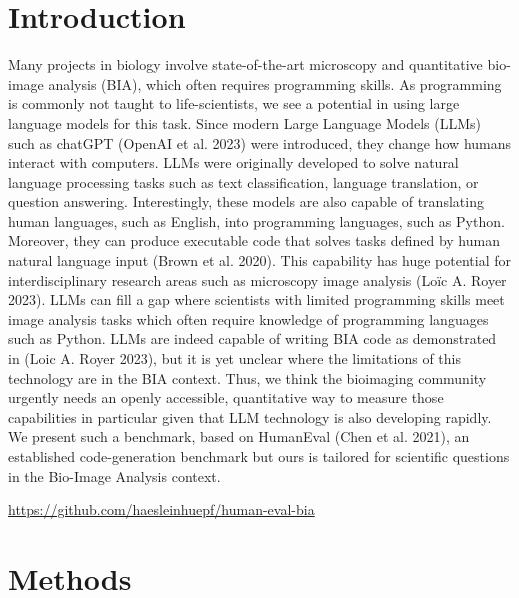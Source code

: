 \documentclass[doubleblind]{ecai}
\begin{document}

\section{Introduction}

Many projects in biology involve state-of-the-art microscopy and  quantitative bio-image analysis (BIA), which often requires programming skills. As programming is commonly not taught to life-scientists, we see a potential in using large language models for this task. Since modern Large Language Models (LLMs) such as chatGPT (OpenAI et al. 2023) were introduced, they change how humans interact with computers. LLMs were originally developed to solve  natural language processing tasks such as  text classification, language translation, or question answering. Interestingly, these models  are also capable of translating human languages, such as English, into programming languages, such as Python. Moreover, they can produce executable code that solves tasks defined by human natural language input (Brown et al. 2020). This capability has huge potential for interdisciplinary research areas such as microscopy image analysis (Loïc A. Royer 2023). LLMs can fill a gap where scientists with limited programming skills meet image analysis tasks which often require knowledge of programming languages such as Python. LLMs are indeed capable of writing BIA code as demonstrated in (Loic A. Royer 2023), but it is yet unclear where the limitations of this technology are in the BIA context. Thus, we think the bioimaging community urgently needs an openly accessible, quantitative way to measure those capabilities in particular given that LLM technology is also developing rapidly. We present such a benchmark, based on HumanEval (Chen et al. 2021), an established code-generation benchmark but ours is tailored for scientific questions in the Bio-Image Analysis context.

\begin{blind}
   \url{https://github.com/haesleinhuepf/human-eval-bia}
\end{blind}


\section{Methods}
\end{document}
